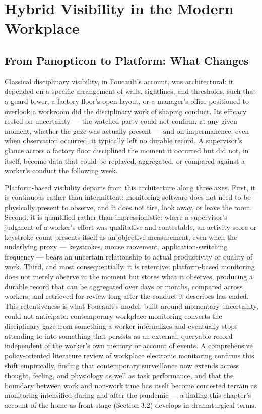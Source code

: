 \documentclass[10pt]{article}
\begin{document}
\section{Hybrid Visibility in the Modern Workplace}

\subsection{From Panopticon to Platform: What Changes}

Classical disciplinary visibility, in Foucault's account, was architectural: it depended on a specific arrangement of walls, sightlines, and thresholds, such that a guard tower, a factory floor's open layout, or a manager's office positioned to overlook a workroom did the disciplinary work of shaping conduct. Its efficacy rested on uncertainty --- the watched party could not confirm, at any given moment, whether the gaze was actually present --- and on impermanence: even when observation occurred, it typically left no durable record. A supervisor's glance across a factory floor disciplined the moment it occurred but did not, in itself, become data that could be replayed, aggregated, or compared against a worker's conduct the following week.

Platform-based visibility departs from this architecture along three axes. First, it is continuous rather than intermittent: monitoring software does not need to be physically present to observe, and it does not tire, look away, or leave the room. Second, it is quantified rather than impressionistic: where a supervisor's judgment of a worker's effort was qualitative and contestable, an activity score or keystroke count presents itself as an objective measurement, even when the underlying proxy --- keystrokes, mouse movement, application-switching frequency --- bears an uncertain relationship to actual productivity or quality of work. Third, and most consequentially, it is retentive: platform-based monitoring does not merely observe in the moment but stores what it observes, producing a durable record that can be aggregated over days or months, compared across workers, and retrieved for review long after the conduct it describes has ended. This retentiveness is what Foucault's model, built around momentary uncertainty, could not anticipate: contemporary workplace monitoring converts the disciplinary gaze from something a worker internalizes and eventually stops attending to into something that persists as an external, queryable record independent of the worker's own memory or account of events. A comprehensive policy-oriented literature review of workplace electronic monitoring confirms this shift empirically, finding that contemporary surveillance now extends across thought, feeling, and physiology as well as task performance, and that the boundary between work and non-work time has itself become contested terrain as monitoring intensified during and after the pandemic \cite{ball2021} --- a finding this chapter's account of the home as front stage (Section 3.2) develops in dramaturgical terms.
\end{document}
